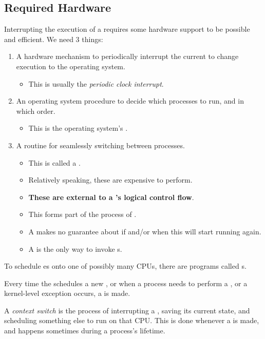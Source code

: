 \subsection{Required Hardware}\label{subsec:Required_Hardware}
Interrupting the execution of a  requires some hardware support to be possible and efficient.
We need 3 things:
\begin{enumerate}[noitemsep]
\item A hardware mechanism to periodically interrupt the current  to change execution to the operating system.
  \begin{itemize}[noitemsep]
  \item This is usually the \emph{periodic clock interrupt}.
  \end{itemize}
\item An operating system procedure to decide which processes to run, and in which order.
  \begin{itemize}[noitemsep]
  \item This is the operating system's .
  \end{itemize}
\item A routine for seamlessly switching between processes.
  \begin{itemize}[noitemsep]
  \item This is called a .
  \item Relatively speaking, these are expensive to perform.
  \item \textbf{These are external to a 's logical control flow}.
  \item This forms part of the process of .
  \item A  makes no guarantee about if and/or when this  will start running again.
  \item A  is the only way to invoke s.
  \end{itemize}
\end{enumerate}

To schedule es onto one of possibly many CPUs, there are programs called s.

Every time the  schedules a new , or when a process needs to perform a , or a kernel-level exception occurs, a  is made.
\begin{definition}\label{def:Context_Switch}
  A \emph{context switch} is the process of interrupting a , saving its current state, and scheduling something else to run on that CPU.\@
  This is done whenever a  is made, and happens sometimes during a process's lifetime.
\end{definition}

